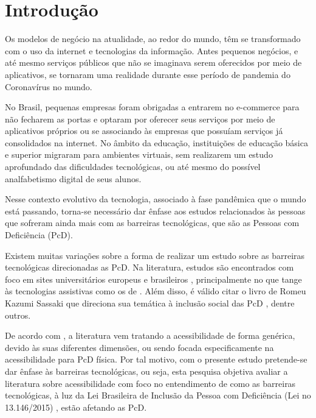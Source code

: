 \documentclass{textolivre}
\begin{document}
\begin{polyabstract}
\begin{english}
\begin{abstract}
\end{abstract}
\end{english}

\end{polyabstract}


\section{Introdução}\label{sec-intro}
Os modelos de negócio na atualidade, ao redor do mundo, têm se transformado com o uso da internet e tecnologias da informação. Antes pequenos negócios, e até mesmo serviços públicos que não se imaginava serem oferecidos por meio de aplicativos, se tornaram uma realidade durante esse período de pandemia do Coronavírus no mundo.

No Brasil, pequenas empresas foram obrigadas a entrarem no e-commerce para não fecharem as portas e optaram por oferecer seus serviços por meio de aplicativos próprios ou se associando às empresas que possuíam serviços já consolidados na internet. No âmbito da educação, instituições de educação básica e superior migraram para ambientes virtuais, sem realizarem um estudo aprofundado das dificuldades tecnológicas, ou até mesmo do possível analfabetismo digital de seus alunos.

Nesse contexto evolutivo da tecnologia, associado à fase pandêmica que o mundo está passando, torna-se necessário dar ênfase aos estudos relacionados às pessoas que sofreram ainda mais com as barreiras tecnológicas, que são as Pessoas com Deficiência (PcD).

Existem muitas variações sobre a forma de realizar um estudo sobre as barreiras tecnológicas direcionadas as PcD. Na literatura, estudos são encontrados com foco em sites universitários europeus \cite{ortega2013} e brasileiros \cite{cantoranipilatti2015}, principalmente no que tange às tecnologias assistivas como os de \textcite{bersch2009, bruno2019, galvaofilho2011, hott2019, martins2012}. Além disso, é válido citar o livro de Romeu Kazumi Sassaki que direciona sua temática à inclusão social das PcD \cite{sassaki2006}, dentre outros.

De acordo com \textcite{vianna2017}, a literatura vem tratando a acessibilidade de forma genérica, devido às suas diferentes dimensões, ou sendo focada especificamente na acessibilidade para PcD física. Por tal motivo, com o presente estudo pretende-se dar ênfase às barreiras tecnológicas, ou seja, esta pesquisa objetiva avaliar a literatura sobre acessibilidade com foco no entendimento de como as barreiras tecnológicas, à luz da Lei Brasileira de Inclusão da Pessoa com Deficiência (Lei no 13.146/2015) \cite{brasil_lei_2015}, estão afetando as PcD.
\end{document}
